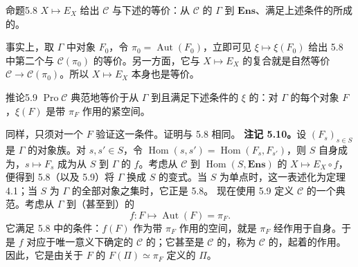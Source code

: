 \begin{SGAresult}{命题}{5.8}
$X\mapsto E_X$ 给出 $\mathcal C$ 与下述的等价：从 $\mathcal C$ 的 $\Gamma$ 到 $\mathbf{Ens}$、满足上述条件的所成的。
\end{SGAresult}
事实上，取 $\Gamma$ 中对象 $F_0$，令 $\pi_0=\operatorname{Aut}(F_0)$，立即可见 $\xi\mapsto\xi(F_0)$ 给出 5.8 中第二个与 $\mathcal C(\pi_0)$ 的等价。另一方面，它与 $X\mapsto E_X$ 的复合就是自然等价 $\mathcal C\to\mathcal C(\pi_0)$。所以 $X\mapsto E_X$ 本身也是等价。
\begin{SGAresult}{推论}{5.9}
$\operatorname{Pro}\mathcal C$ 典范地等价于从 $\Gamma$ 到且满足下述条件的 $\xi$ 的：对 $\Gamma$ 的每个对象 $F$，$\xi(F)$ 是带 $\pi_F$ 作用的紧空间。
\end{SGAresult}
同样，只须对一个 $F$ 验证这一条件。证明与 5.8 相同。
\textbf{注记 5.10。}设 $(F_s)_{s\in S}$ 是 $\Gamma$ 的对象族。对 $s,s'\in S$，令 $\operatorname{Hom}(s,s')=\operatorname{Hom}(F_s,F_{s'})$，则 $S$ 自身成为，$s\mapsto F_s$ 成为从 $S$ 到 $\Gamma$ 的 $f$。考虑从 $\mathcal C$ 到 $\operatorname{Hom}(S,\mathbf{Ens})$ 的 $X\mapsto E_X\circ f$，便得到 5.8（以及 5.9）将 $\Gamma$ 换成 $S$ 的变式。当 $S$ 为单点时，这一表述化为定理 4.1；当 $S$ 为 $\Gamma$ 的全部对象之集时，它正是 5.8。
现在使用 5.9 定义 $\mathcal C$ 的一个典范。考虑从 $\Gamma$ 到（甚至到）的
\[f:F\longmapsto\operatorname{Aut}(F)=\pi_F.\]
它满足 5.8 中的条件：$f(F)$ 作为带 $\pi_F$ 作用的空间，就是 $\pi_F$ 经作用于自身。于是 $f$ 对应于唯一意义下确定的 $\mathcal C$ 的；它甚至是 $\mathcal C$ 的，称为 $\mathcal C$ 的，起着的作用。因此，它是由关于 $F$ 的 $F(\Pi)\simeq\pi_F$ 定义的 $\Pi$。
